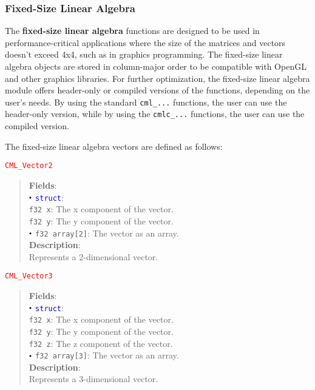 \documentclass[a4paper,oneside,8pt]{extarticle}
\newcommand{\union}[1]{
  \noindent\textcolor{red}{\texttt{#1}}
  \vspace{-0.3em}
}
\renewcommand{\dot}{\raisebox{0.3ex}{\scalebox{0.6}{$\bullet$}}}
\theoremstyle{definition}
\begin{document}
\subsubsection{Fixed-Size Linear Algebra}

The \textbf{fixed-size linear algebra} functions are designed to be used in performance-critical applications where the size of the matrices and vectors doesn't exceed 4x4, such as in graphics programming. The fixed-size linear algebra objects are stored in column-major order to be compatible with OpenGL and other graphics libraries. For further optimization, the fixed-size linear algebra module offers header-only or compiled versions of the functions, depending on the user's needs. By using the standard \texttt{cml\_...} functions, the user can use the header-only version, while by using the \texttt{cmlc\_...} functions, the user can use the compiled version.

The fixed-size linear algebra vectors are defined as follows: \newline

\union{CML\_Vector2}
\begin{quote}
  \textbf{Fields}: \\
  $\dot$ \textcolor{blue}{\texttt{struct}}: \\
  \indent\hspace{1em} \texttt{f32 x}: The x component of the vector. \\
  \indent\hspace{1em} \texttt{f32 y}: The y component of the vector. \\
  $\dot$ \texttt{f32 array[2]}: The vector as an array. \\

  \vspace{-0.75em}
  \textbf{Description}: \\
  Represents a 2-dimensional vector. \\
\end{quote}

\union{CML\_Vector3}
\begin{quote}
  \textbf{Fields}: \\
  $\dot$ \textcolor{blue}{\texttt{struct}}: \\
  \indent\hspace{1em} \texttt{f32 x}: The x component of the vector. \\
  \indent\hspace{1em} \texttt{f32 y}: The y component of the vector. \\
  \indent\hspace{1em} \texttt{f32 z}: The z component of the vector. \\
  $\dot$ \texttt{f32 array[3]}: The vector as an array. \\

  \vspace{-0.75em}
  \textbf{Description}: \\
  Represents a 3-dimensional vector. \\
\end{quote}
\end{document}
